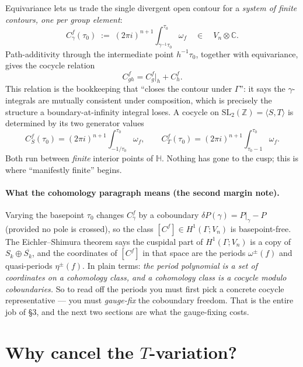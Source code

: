\documentclass[11pt]{article}
\newcommand{\HH}{\mathbb{H}}
\newcommand{\CC}{\mathbb{C}}
\newcommand{\ZZ}{\mathbb{Z}}
\newcommand{\SLZ}{\mathrm{SL}_2(\ZZ)}
\theoremstyle{plain}
\begin{document}
Equivariance lets us trade the single divergent open contour for a
\emph{system of finite contours, one per group element}:
\[
  C^f_\gamma(\tau_0)
  \;:=\; (2\pi i)^{n+1}\!\int_{\gamma^{-1}\tau_0}^{\tau_0}\! \omega_f
  \quad\in\quad V_n\otimes\CC .
\]
Path-additivity through the intermediate point $h^{-1}\tau_0$, together
with equivariance, gives the cocycle relation
\[
  C^f_{gh}=C^f_g\big|_h + C^f_h .
\]
This relation is the bookkeeping that ``closes the contour under
$\Gamma$'': it says the $\gamma$-integrals are mutually consistent under
composition, which is precisely the structure a boundary-at-infinity
integral loses. A cocycle on $\SLZ=\langle S,T\rangle$ is determined by its
two generator values
\[
  C^f_S(\tau_0)=(2\pi i)^{n+1}\!\!\int_{-1/\tau_0}^{\tau_0}\!\omega_f,
  \qquad
  C^f_T(\tau_0)=(2\pi i)^{n+1}\!\!\int_{\tau_0-1}^{\tau_0}\!\omega_f .
\]
Both run between \emph{finite} interior points of $\HH$. Nothing has gone to
the cusp; this is where ``manifestly finite'' begins.

\paragraph{What the cohomology paragraph means (the second margin note).}
Varying the basepoint $\tau_0$ changes $C^f_\gamma$ by a coboundary
$\delta P(\gamma)=P|_\gamma-P$ (provided no pole is crossed), so the class
$[C^f]\in H^1(\Gamma;V_n)$ is basepoint-free. The Eichler--Shimura theorem
says the cuspidal part of $H^1(\Gamma;V_n)$ is a copy of
$S_k\oplus\overline{S_k}$, and the coordinates of $[C^f]$ in that space are
the periods $\omega^\pm(f)$ and quasi-periods $\eta^\pm(f)$. In plain terms:
\emph{the period polynomial is a set of coordinates on a cohomology class,
and a cohomology class is a cocycle modulo coboundaries.} So to read off the
periods you must first pick a concrete cocycle representative --- you must
\emph{gauge-fix} the coboundary freedom. That is the entire job of \S3, and
the next two sections are what the gauge-fixing costs.

\section{Why cancel the $T$-variation?}
\end{document}
